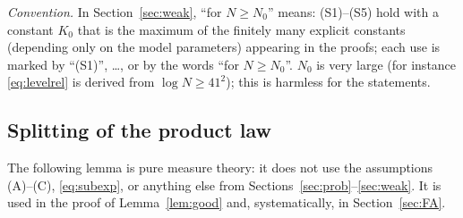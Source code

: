 \noindent\emph{Convention.} In Section~\ref{sec:weak}, ``for $N\ge N_0$'' means: (S1)--(S5) hold with a constant $K_0$ that is the maximum of the finitely many explicit constants (depending only on the model parameters) appearing in the proofs;
each use is marked by ``(S1)'', \dots, or by the words ``for $N\ge N_0$''. $N_0$ is very large (for instance \eqref{eq:levelrel} is derived from $\log N\ge41^2$); this is harmless for the statements.
\subsection{Splitting of the product law}\label{sec:split}
The following lemma is pure measure theory: it does not use the assumptions (A)--(C), \eqref{eq:subexp}, or anything else from Sections~\ref{sec:prob}--\ref{sec:weak}.
It is used in the proof of Lemma~\ref{lem:good} and, systematically, in Section~\ref{sec:FA}.

